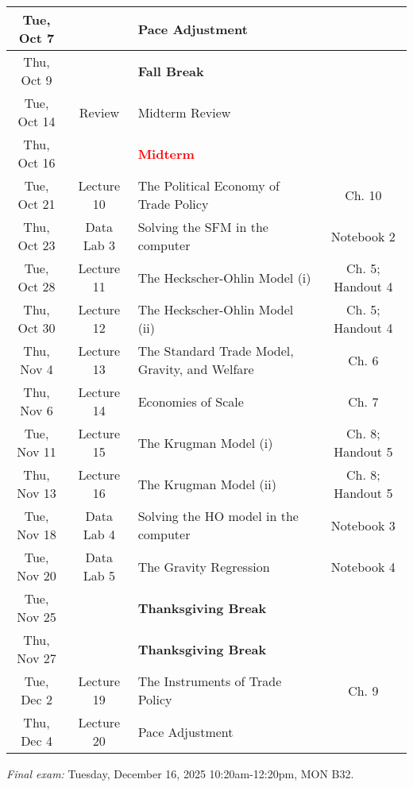 \documentclass[11pt]{article}
\begin{document}
\begin{center}
\begin{tabular}{|c|c|l|c|}
        Tue, Oct 7 &  & Pace Adjustment &   \\ \hline

        Thu, Oct 9 &  & \textbf{Fall Break} & \\ \hline
        
        Tue, Oct 14 & Review & Midterm Review  &   \\ \hline
        Thu, Oct 16 &  & \textcolor{red}{\textbf{Midterm}} &   \\ \hline
		
        Tue, Oct 21 & Lecture 10 & The Political Economy of Trade Policy &  Ch. 10 \\ \hline

        Thu, Oct 23 &Data Lab 3 & Solving the SFM in the computer & Notebook 2 \\ \hline

        Tue,  Oct 28 &Lecture 11 & The Heckscher-Ohlin Model (i)  & Ch. 5; Handout 4  \\ \hline

        Thu, Oct 30 &  Lecture 12 & The Heckscher-Ohlin Model (ii) & Ch. 5; Handout 4  \\ \hline 

        Thu, Nov 4 & Lecture 13 & The Standard Trade Model, Gravity, and Welfare   &  Ch. 6   \\ \hline
        
        Thu, Nov 6 & Lecture 14 & Economies of Scale & Ch. 7   \\ \hline

        Tue, Nov 11 & Lecture 15 & The Krugman Model (i) & Ch. 8; Handout 5 \\  \hline

        Thu, Nov 13 &Lecture 16 & The Krugman Model (ii)   & Ch. 8; Handout 5   \\ \hline

        Tue, Nov 18 &  Data Lab 4 & Solving the HO model in the computer & Notebook 3 \\ \hline

        Tue, Nov 20 & Data Lab 5 & The Gravity Regression & Notebook 4 \\  \hline

        Tue, Nov 25 &  & \textbf{Thanksgiving Break} &   \\  \hline

        Thu, Nov 27 &   & \textbf{Thanksgiving Break}    &    \\ \hline

        Tue, Dec 2 & Lecture 19 & The Instruments of Trade Policy & Ch. 9 \\  \hline

        Thu, Dec 4 &  Lecture 20 & Pace Adjustment &    \\ \hline
\end{tabular}
\end{center}

\smallskip
\noindent \textit{Final exam:} Tuesday, December 16, 2025 10:20am-12:20pm, MON	B32.
\end{document}
